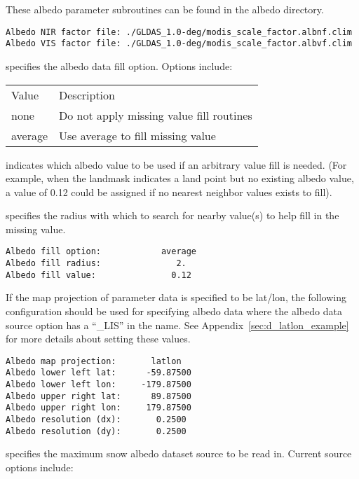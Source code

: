  These albedo parameter subroutines can be found in the albedo directory.
  

 \begin{Verbatim}[frame=single]
Albedo NIR factor file: ./GLDAS_1.0-deg/modis_scale_factor.albnf.clim
Albedo VIS factor file: ./GLDAS_1.0-deg/modis_scale_factor.albvf.clim
 \end{Verbatim}

 
  specifies the albedo
 data fill option.  Options include:

 \begin{tabular}{ll}
 Value   & Description                              \\
 none    & Do not apply missing value fill routines \\
 average & Use average to fill missing value        \\
 \end{tabular}

  indicates which albedo
 value to be used if an arbitrary value fill is needed. 
(For example, when the landmask indicates a land point but no existing 
 albedo value, a value of 0.12 could be assigned if 
 no nearest neighbor values exists to fill).

  specifies the radius with which
 to search for nearby value(s) to help fill in the missing value.
 

 \begin{Verbatim}[frame=single]
Albedo fill option:            average
Albedo fill radius:               2.
Albedo fill value:               0.12
 \end{Verbatim}

 
 If the map projection of parameter data is specified to be lat/lon, 
 the following configuration should be used for specifying albedo data
 where the albedo data source option has a ``\_LIS'' in the name.
 See Appendix~\ref{sec:d_latlon_example} for more details about
 setting these values.
  

 \begin{Verbatim}[frame=single]
Albedo map projection:       latlon
Albedo lower left lat:      -59.87500
Albedo lower left lon:     -179.87500
Albedo upper right lat:      89.87500
Albedo upper right lon:     179.87500
Albedo resolution (dx):       0.2500
Albedo resolution (dy):       0.2500
 \end{Verbatim}

 
  specifies the maximum snow albedo
 dataset source to be read in. Current source options include:

